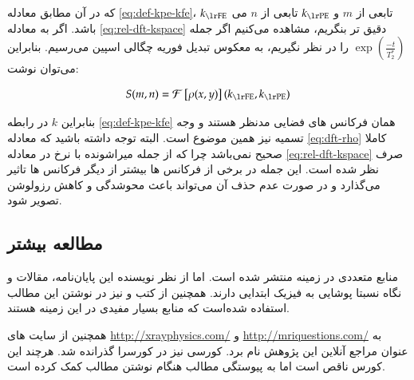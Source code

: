 که در آن مطابق معادله \ref{eq:def-kpe-kfe}، $k_{\lrtext{FE}}$ تابعی از $m$ و $k_{\lrtext{PE}}$ تابعی از $n$ می باشد. اگر به معادله \ref{eq:rel-dft-kspace} دقیق تر بنگریم، مشاهده می‌کنیم اگر جمله $\exp(\frac{-t}{T_2^*})$ را در نظر نگیریم، به معکوس تبدیل فوریه چگالی اسپین می‌رسیم. بنابراین می‌توان نوشت:

\removevspace
\begin{equation} \label{eq:dft-rho}
		S(m,n) = \F\left[\rho(x,y)\right](k_{\lrtext{FE}}, k_{\lrtext{PE}})
\end{equation}

بنابراین $k$ در رابطه \ref{eq:def-kpe-kfe} همان فرکانس های فضایی مدنظر هستند و وجه تسمیه \kspace نیز همین موضوع است. البته توجه داشته باشید که معادله \ref{eq:dft-rho} کاملا صحیح نمی‌باشد چرا که از جمله میراشونده با نرخ \TtwoStar در معادله \ref{eq:rel-dft-kspace} صرف نظر شده است. این جمله در برخی از فرکانس ها بیشتر از دیگر فرکانس ها تاثیر می‌گذارد و در صورت عدم حذف آن می‌تواند باعث محوشدگی و کاهش رزولوشن تصویر شود.











\FloatBarrier
\subsection{مطالعه بیشتر}
منابع متعددی در زمینه \mri منتشر شده است. اما از نظر نویسنده این پایان‌نامه، مقالات \cite{McRobbie} و \cite{SpinEchoMagnetic2013} نگاه نسبتا پوشایی به فیزیک ابتدایی \mri دارند. همچنین از کتب \cite{book:basic-principles-and-applications} و \cite{book:MRIfromPictureToProton} نیز در نوشتن این مطالب استفاده شده‌است که منابع بسیار مفیدی در این زمینه هستند.

 همچنین از سایت های
 \url{http://xrayphysics.com/} و
 \url{http://mriquestions.com/}
 به عنوان مراجع آنلاین این پژوهش نام برد. کورسی نیز در کورسرا
گذرانده شد. هرچند این کورس ناقص است اما به پیوستگی مطالب هنگام نوشتن مطالب کمک کرده است.
